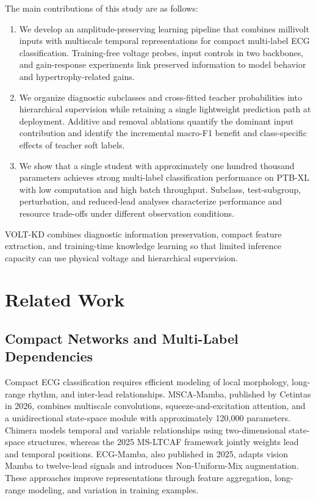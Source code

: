 \documentclass[11pt,a4paper]{article}
\begin{document}
The main contributions of this study are as follows:
\begin{enumerate}
\item We develop an amplitude-preserving learning pipeline that combines millivolt inputs with multiscale temporal representations for compact multi-label ECG classification. Training-free voltage probes, input controls in two backbones, and gain-response experiments link preserved information to model behavior and hypertrophy-related gains.
\item We organize diagnostic subclasses and cross-fitted teacher probabilities into hierarchical supervision while retaining a single lightweight prediction path at deployment. Additive and removal ablations quantify the dominant input contribution and identify the incremental macro-F1 benefit and class-specific effects of teacher soft labels.
\item We show that a single student with approximately one hundred thousand parameters achieves strong multi-label classification performance on PTB-XL with low computation and high batch throughput. Subclass, test-subgroup, perturbation, and reduced-lead analyses characterize performance and resource trade-offs under different observation conditions.
\end{enumerate}

VOLT-KD combines diagnostic information preservation, compact feature extraction, and training-time knowledge learning so that limited inference capacity can use physical voltage and hierarchical supervision.
\section{Related Work}
\subsection{Compact Networks and Multi-Label Dependencies}
Compact ECG classification requires efficient modeling of local morphology, long-range rhythm, and inter-lead relationships. MSCA-Mamba, published by Cetintas in 2026, combines multiscale convolutions, squeeze-and-excitation attention, and a unidirectional state-space module with approximately 120,000 parameters\cite{cetintas2026}. Chimera models temporal and variable relationships using two-dimensional state-space structures\cite{behrouz2024}, whereas the 2025 MS-LTCAF framework jointly weights lead and temporal positions\cite{feng2025}. ECG-Mamba, also published in 2025, adapts vision Mamba to twelve-lead signals and introduces Non-Uniform-Mix augmentation\cite{jiang2025}. These approaches improve representations through feature aggregation, long-range modeling, and variation in training examples.
\end{document}
